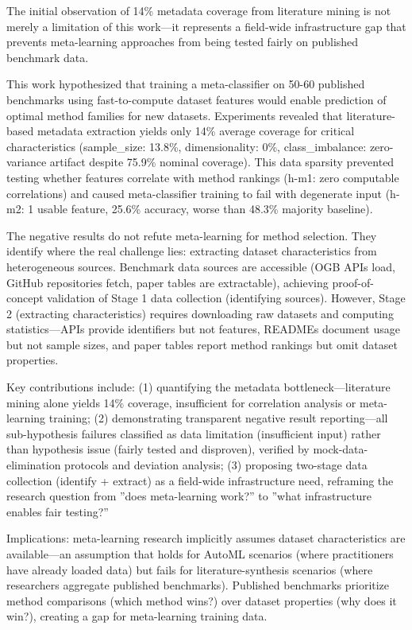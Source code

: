 
The initial observation of 14\% metadata coverage from literature mining is not merely a limitation of this work---it represents a field-wide infrastructure gap that prevents meta-learning approaches from being tested fairly on published benchmark data.

This work hypothesized that training a meta-classifier on 50-60 published benchmarks using fast-to-compute dataset features would enable prediction of optimal method families for new datasets. Experiments revealed that literature-based metadata extraction yields only 14\% average coverage for critical characteristics (sample\_size: 13.8\%, dimensionality: 0\%, class\_imbalance: zero-variance artifact despite 75.9\% nominal coverage). This data sparsity prevented testing whether features correlate with method rankings (h-m1: zero computable correlations) and caused meta-classifier training to fail with degenerate input (h-m2: 1 usable feature, 25.6\% accuracy, worse than 48.3\% majority baseline).

The negative results do not refute meta-learning for method selection. They identify where the real challenge lies: extracting dataset characteristics from heterogeneous sources. Benchmark data sources are accessible (OGB APIs load, GitHub repositories fetch, paper tables are extractable), achieving proof-of-concept validation of Stage 1 data collection (identifying sources). However, Stage 2 (extracting characteristics) requires downloading raw datasets and computing statistics---APIs provide identifiers but not features, READMEs document usage but not sample sizes, and paper tables report method rankings but omit dataset properties.

Key contributions include: (1) quantifying the metadata bottleneck---literature mining alone yields 14\% coverage, insufficient for correlation analysis or meta-learning training; (2) demonstrating transparent negative result reporting---all sub-hypothesis failures classified as data limitation (insufficient input) rather than hypothesis issue (fairly tested and disproven), verified by mock-data-elimination protocols and deviation analysis; (3) proposing two-stage data collection (identify + extract) as a field-wide infrastructure need, reframing the research question from ''does meta-learning work?'' to ''what infrastructure enables fair testing?''

Implications: meta-learning research implicitly assumes dataset characteristics are available---an assumption that holds for AutoML scenarios (where practitioners have already loaded data) but fails for literature-synthesis scenarios (where researchers aggregate published benchmarks). Published benchmarks prioritize method comparisons (which method wins?) over dataset properties (why does it win?), creating a gap for meta-learning training data.

